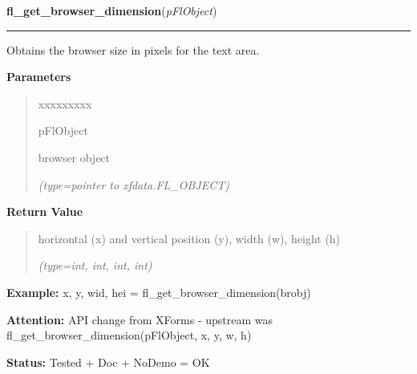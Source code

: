 \hspace{.8\funcindent}\begin{boxedminipage}{\funcwidth}

    \raggedright \textbf{fl\_get\_browser\_dimension}(\textit{pFlObject})

    \vspace{-1.5ex}

    \rule{\textwidth}{0.5\fboxrule}
\setlength{\parskip}{2ex}
    Obtains the browser size in pixels for the text area.

\setlength{\parskip}{1ex}
      \textbf{Parameters}
      \vspace{-1ex}

      \begin{quote}
        \begin{Ventry}{xxxxxxxxx}

          \item[pFlObject]

          browser object

            {\it (type=pointer to xfdata.FL\_OBJECT)}

        \end{Ventry}

      \end{quote}

      \textbf{Return Value}
    \vspace{-1ex}

      \begin{quote}
      horizontal (x) and vertical position (y), width (w), height (h)

      {\it (type=int, int, int, int)}

      \end{quote}

\textbf{Example:} x, y, wid, hei = fl\_get\_browser\_dimension(brobj)



\textbf{Attention:} API change from XForms - upstream was 
fl\_get\_browser\_dimension(pFlObject, x, y, w, h)



\textbf{Status:} Tested + Doc + NoDemo = OK



    \end{boxedminipage}

    \label{xformslib:flbrowser:fl_set_browser_dblclick_callback}

